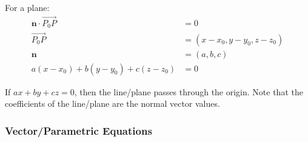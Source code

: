 \documentclass[../linear-algebra.tex]{subfiles}
\begin{document}
\noindent For a plane:
\begin{align*}
\mathbf{n} \cdot \overrightarrow{P_0P} &= 0 \\
\overrightarrow{P_0P} &= (x - x_0, y - y_0, z - z_0) \\
\mathbf{n} &= (a, b, c) \\
a(x - x_0) + b(y - y_0) + c(z - z_0) &= 0
\end{align*}

\noindent If $ax + by + cz = 0$, then the line/plane passes through the origin.\newline
Note that the coefficients of the line/plane are the normal vector values.


\subsubsection*{Vector/Parametric Equations}
\end{document}
